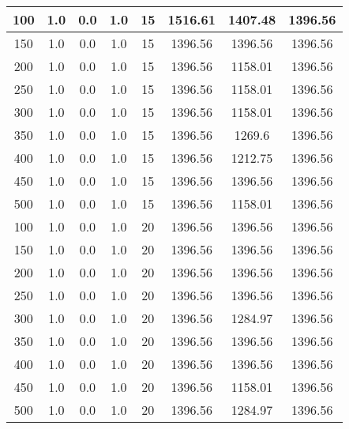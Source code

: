 \documentclass[a4paper, 12pt]{extreport}
\begin{document}
\begin{itemize}
\begin{longtable}{|c|c|c|c|c|c|c|c|}
			100 & 1.0 & 0.0 & 1.0 & 15 & 1516.61 & 1407.48 & 1396.56 \\\hline
			150 & 1.0 & 0.0 & 1.0 & 15 & 1396.56 & 1396.56 & 1396.56 \\\hline
			200 & 1.0 & 0.0 & 1.0 & 15 & 1396.56 & 1158.01 & 1396.56 \\\hline
			250 & 1.0 & 0.0 & 1.0 & 15 & 1396.56 & 1158.01 & 1396.56 \\\hline
			300 & 1.0 & 0.0 & 1.0 & 15 & 1396.56 & 1158.01 & 1396.56 \\\hline
			350 & 1.0 & 0.0 & 1.0 & 15 & 1396.56 & 1269.6 & 1396.56 \\\hline
			400 & 1.0 & 0.0 & 1.0 & 15 & 1396.56 & 1212.75 & 1396.56 \\\hline
			450 & 1.0 & 0.0 & 1.0 & 15 & 1396.56 & 1396.56 & 1396.56 \\\hline
			500 & 1.0 & 0.0 & 1.0 & 15 & 1396.56 & 1158.01 & 1396.56 \\\hline
			100 & 1.0 & 0.0 & 1.0 & 20 & 1396.56 & 1396.56 & 1396.56 \\\hline
			150 & 1.0 & 0.0 & 1.0 & 20 & 1396.56 & 1396.56 & 1396.56 \\\hline
			200 & 1.0 & 0.0 & 1.0 & 20 & 1396.56 & 1396.56 & 1396.56 \\\hline
			250 & 1.0 & 0.0 & 1.0 & 20 & 1396.56 & 1396.56 & 1396.56 \\\hline
			300 & 1.0 & 0.0 & 1.0 & 20 & 1396.56 & 1284.97 & 1396.56 \\\hline
			350 & 1.0 & 0.0 & 1.0 & 20 & 1396.56 & 1396.56 & 1396.56 \\\hline
			400 & 1.0 & 0.0 & 1.0 & 20 & 1396.56 & 1396.56 & 1396.56 \\\hline
			450 & 1.0 & 0.0 & 1.0 & 20 & 1396.56 & 1158.01 & 1396.56 \\\hline
			500 & 1.0 & 0.0 & 1.0 & 20 & 1396.56 & 1284.97 & 1396.56 \\\hline
			
		\end{longtable}
		
		
		

\end{itemize}
\end{document}
